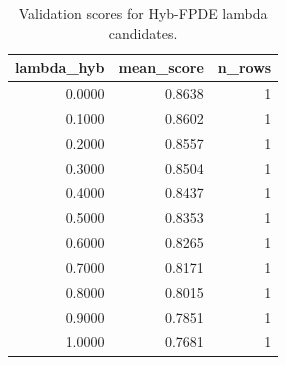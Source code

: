 \begin{table}[t]
\caption{Validation scores for Hyb-FPDE lambda candidates.}
\label{tab:lambda_distribution_computed}
\centering
\begin{tabular}{rrr}
\toprule
lambda\_hyb & mean\_score & n\_rows \\
\midrule
0.0000 & 0.8638 & 1 \\
0.1000 & 0.8602 & 1 \\
0.2000 & 0.8557 & 1 \\
0.3000 & 0.8504 & 1 \\
0.4000 & 0.8437 & 1 \\
0.5000 & 0.8353 & 1 \\
0.6000 & 0.8265 & 1 \\
0.7000 & 0.8171 & 1 \\
0.8000 & 0.8015 & 1 \\
0.9000 & 0.7851 & 1 \\
1.0000 & 0.7681 & 1 \\
\bottomrule
\end{tabular}

\end{table}
